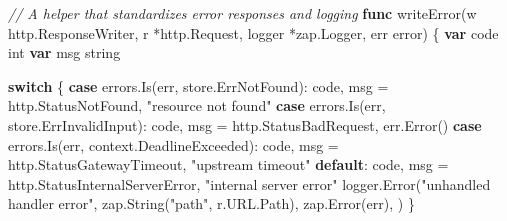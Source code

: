 \documentclass[
]{article}
\newenvironment{Shaded}{}{}
\newcommand{\CommentTok}[1]{\textcolor[rgb]{0.38,0.63,0.69}{\textit{#1}}}
\newcommand{\ControlFlowTok}[1]{\textcolor[rgb]{0.00,0.44,0.13}{\textbf{#1}}}
\newcommand{\DataTypeTok}[1]{\textcolor[rgb]{0.56,0.13,0.00}{#1}}
\newcommand{\KeywordTok}[1]{\textcolor[rgb]{0.00,0.44,0.13}{\textbf{#1}}}
\newcommand{\NormalTok}[1]{#1}
\newcommand{\OperatorTok}[1]{\textcolor[rgb]{0.40,0.40,0.40}{#1}}
\newcommand{\StringTok}[1]{\textcolor[rgb]{0.25,0.44,0.63}{#1}}
\begin{document}
\begin{Shaded}
\begin{Highlighting}[]
\CommentTok{// A helper that standardizes error responses and logging}
\KeywordTok{func}\NormalTok{ writeError}\OperatorTok{(}\NormalTok{w http}\OperatorTok{.}\NormalTok{ResponseWriter}\OperatorTok{,}\NormalTok{ r }\OperatorTok{*}\NormalTok{http}\OperatorTok{.}\NormalTok{Request}\OperatorTok{,}\NormalTok{ logger }\OperatorTok{*}\NormalTok{zap}\OperatorTok{.}\NormalTok{Logger}\OperatorTok{,}\NormalTok{ err }\DataTypeTok{error}\OperatorTok{)} \OperatorTok{\{}
    \KeywordTok{var}\NormalTok{ code }\DataTypeTok{int}
    \KeywordTok{var}\NormalTok{ msg }\DataTypeTok{string}

    \ControlFlowTok{switch} \OperatorTok{\{}
    \ControlFlowTok{case}\NormalTok{ errors}\OperatorTok{.}\NormalTok{Is}\OperatorTok{(}\NormalTok{err}\OperatorTok{,}\NormalTok{ store}\OperatorTok{.}\NormalTok{ErrNotFound}\OperatorTok{):}
\NormalTok{        code}\OperatorTok{,}\NormalTok{ msg }\OperatorTok{=}\NormalTok{ http}\OperatorTok{.}\NormalTok{StatusNotFound}\OperatorTok{,} \StringTok{"resource not found"}
    \ControlFlowTok{case}\NormalTok{ errors}\OperatorTok{.}\NormalTok{Is}\OperatorTok{(}\NormalTok{err}\OperatorTok{,}\NormalTok{ store}\OperatorTok{.}\NormalTok{ErrInvalidInput}\OperatorTok{):}
\NormalTok{        code}\OperatorTok{,}\NormalTok{ msg }\OperatorTok{=}\NormalTok{ http}\OperatorTok{.}\NormalTok{StatusBadRequest}\OperatorTok{,}\NormalTok{ err}\OperatorTok{.}\NormalTok{Error}\OperatorTok{()}
    \ControlFlowTok{case}\NormalTok{ errors}\OperatorTok{.}\NormalTok{Is}\OperatorTok{(}\NormalTok{err}\OperatorTok{,}\NormalTok{ context}\OperatorTok{.}\NormalTok{DeadlineExceeded}\OperatorTok{):}
\NormalTok{        code}\OperatorTok{,}\NormalTok{ msg }\OperatorTok{=}\NormalTok{ http}\OperatorTok{.}\NormalTok{StatusGatewayTimeout}\OperatorTok{,} \StringTok{"upstream timeout"}
    \ControlFlowTok{default}\OperatorTok{:}
\NormalTok{        code}\OperatorTok{,}\NormalTok{ msg }\OperatorTok{=}\NormalTok{ http}\OperatorTok{.}\NormalTok{StatusInternalServerError}\OperatorTok{,} \StringTok{"internal server error"}
\NormalTok{        logger}\OperatorTok{.}\NormalTok{Error}\OperatorTok{(}\StringTok{"unhandled handler error"}\OperatorTok{,}
\NormalTok{            zap}\OperatorTok{.}\NormalTok{String}\OperatorTok{(}\StringTok{"path"}\OperatorTok{,}\NormalTok{ r}\OperatorTok{.}\NormalTok{URL}\OperatorTok{.}\NormalTok{Path}\OperatorTok{),}
\NormalTok{            zap}\OperatorTok{.}\NormalTok{Error}\OperatorTok{(}\NormalTok{err}\OperatorTok{),}
        \OperatorTok{)}
    \OperatorTok{\}}


\end{Highlighting}
\end{Shaded}
\end{document}
